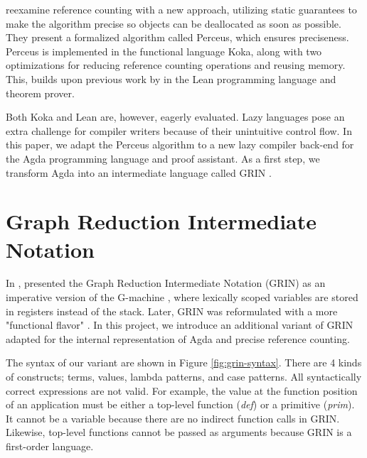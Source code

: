 \documentclass[10pt, twocolumn]{article}
\begin{document}
\citet{reinking2021} reexamine reference counting with a new approach, utilizing static guarantees to make the algorithm precise so objects can be deallocated as soon as possible.
They present a formalized algorithm called Perceus, which ensures preciseness. 
Perceus is implemented in the functional language Koka, along with two optimizations for reducing reference counting operations and reusing memory.
This, builds upon previous work by \citet{ullrich2021} in the Lean programming language and theorem prover. 

Both Koka and Lean are, however, eagerly evaluated. 
Lazy languages pose an extra challenge for compiler writers because of their unintuitive control flow. 
In this paper, we adapt the Perceus algorithm to a new lazy compiler back-end for the Agda programming language and proof assistant.
As a first step, we transform Agda into an intermediate language called GRIN \citep{johnsson1991}.

\section{Graph Reduction Intermediate Notation}
In \citeyear{johnsson1991}, \citeauthor{johnsson1991} presented the Graph Reduction Intermediate Notation (GRIN) as an imperative version of the G-machine \citep{johnsson1984}, where lexically scoped variables are stored in registers instead of the stack. 
Later, GRIN was reformulated with a more "functional flavor" \citep{boquist1995}.
In this project, we introduce an additional variant of GRIN adapted for the internal representation of Agda and precise reference counting. 

The syntax of our variant are shown in Figure \ref{fig:grin-syntax}.
There are 4 kinds of constructs; terms, values, lambda patterns, and case patterns.
All syntactically correct expressions are not valid. For example, the value at the function position of an application must be either a top-level function (\emph{def}) or a primitive (\emph{prim}). It cannot be a variable because
there are no indirect function calls in GRIN. Likewise, top-level functions cannot be passed 
as arguments because GRIN is a first-order language.
\end{document}
